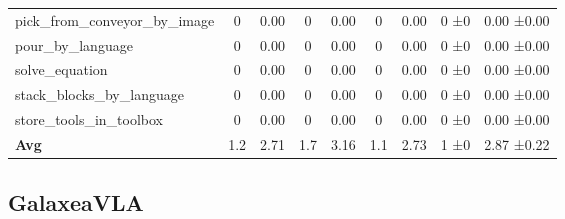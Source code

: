 \begin{table}[H]
{\begin{tabular}{l|c|c|c|c|c|c|c|c}
pick\_from\_conveyor\_by\_image & 0 & 0.00 & 0 & 0.00 & 0 & 0.00 & 0 ±0 & 0.00 ±0.00 \\
pour\_by\_language & 0 & 0.00 & 0 & 0.00 & 0 & 0.00 & 0 ±0 & 0.00 ±0.00 \\
solve\_equation & 0 & 0.00 & 0 & 0.00 & 0 & 0.00 & 0 ±0 & 0.00 ±0.00 \\
stack\_blocks\_by\_language & 0 & 0.00 & 0 & 0.00 & 0 & 0.00 & 0 ±0 & 0.00 ±0.00 \\
store\_tools\_in\_toolbox & 0 & 0.00 & 0 & 0.00 & 0 & 0.00 & 0 ±0 & 0.00 ±0.00 \\
\hline
\textbf{Avg} & 1.2 & 2.71 & 1.7 & 3.16 & 1.1 & 2.73 & 1 ±0 & 2.87 ±0.22 \\
\hline
\end{tabular}
}
\end{table}
\subsection{GalaxeaVLA}
\label{part:galaxeavla}

